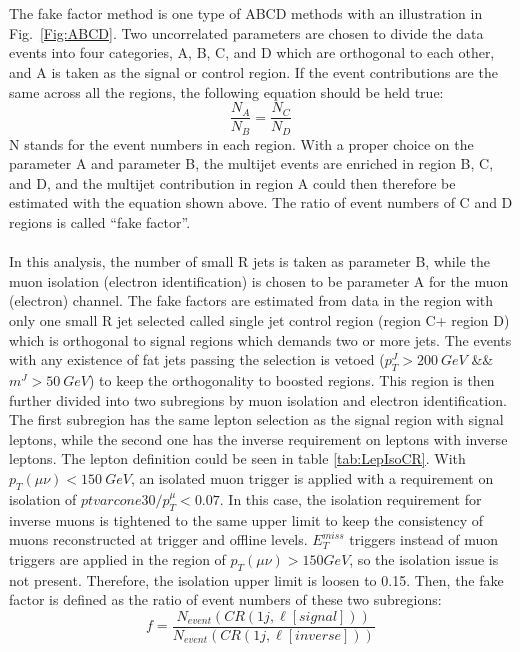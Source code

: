 \\
\\The fake factor method is one type of ABCD methods with an illustration in Fig.~\ref{Fig:ABCD}. Two uncorrelated parameters are chosen to divide the data events into four categories, A, B, C, and D which are orthogonal to each other, and A is taken as the signal or control region. If the event contributions are the same across all the regions, the following equation should be held true:
\begin{equation}
\label{eq:ABCD}
\frac{N_A}{N_B} = \frac{N_C}{N_D}
\end{equation}
N stands for the event numbers in each region. With a proper choice on the parameter A and parameter B, the multijet events are enriched in region B, C, and D, and the multijet contribution in region A could then therefore be estimated with the equation shown above. The ratio of event numbers of C and D regions is called ``fake factor''.
\\
\\In this analysis, the number of small R jets is taken as parameter B, while the muon isolation (electron identification) is chosen to be parameter A for the muon (electron) channel. The fake factors are estimated from data in the region with only one small R jet selected called single jet control region (region C+ region D) which is orthogonal to signal regions which demands two or more jets. The events with any existence of fat jets passing the selection is vetoed ($p_{T}^{J}>200~GeV$ \&\& $m^{J}>50~GeV$) to keep the orthogonality to boosted regions. This region is then further divided into two subregions by muon isolation and electron identification. The first subregion has the same lepton selection as the signal region with signal leptons, while the second one has the inverse requirement on leptons with inverse leptons. The lepton definition could be seen in table \ref{tab:LepIsoCR}. With $p_{T}(\mu\nu)<150~GeV$, an isolated muon trigger is applied with a requirement on isolation of $ptvarcone30/p^{\mu}_{T}<0.07$. In this case, the isolation requirement for inverse muons is tightened to the same upper limit to keep the consistency of muons reconstructed at trigger and offline levels. $E_{T}^{miss}$ triggers instead of muon triggers are applied in the region of $p_{T}(\mu\nu)>150 GeV$, so the isolation issue is not present. Therefore, the isolation upper limit is loosen to 0.15. Then, the fake factor is defined as the ratio of event numbers of these two subregions:
\begin{equation}
\label{eq:ff}
 f = \frac{N_{event}(CR(1j, \ell\left[signal\right]))}{N_{event}(CR(1j, \ell\left[inverse\right]))}
\end{equation}
